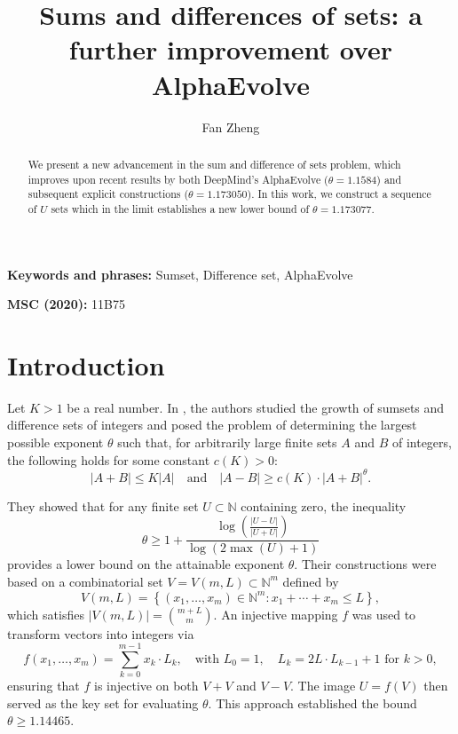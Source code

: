 \documentclass[12 pt]{article}
\title{Sums and differences of sets: a further improvement over AlphaEvolve}
\author{Fan Zheng}
\begin{document}
\maketitle

\begin{abstract}
We present a new advancement in the sum and difference of sets problem, which improves upon recent results by both DeepMind's AlphaEvolve ($\theta = 1.1584$) and subsequent explicit constructions ($\theta = 1.173050$). In this work, we construct a sequence of $U$ sets which in the limit establishes a new lower bound of $\theta = 1.173077$.
\end{abstract}

\noindent\textbf{Keywords and phrases:} Sumset, Difference set, AlphaEvolve

\medskip

\noindent\textbf{MSC (2020):} 11B75

\section{Introduction}

Let \( K > 1 \) be a real number. In \cite{gyarmati2007}, the authors studied the growth of sumsets and difference sets of integers and posed the problem of determining the largest possible exponent \( \theta \) such that, for arbitrarily large finite sets \( A \) and \( B \) of integers, the following holds for some constant \( c(K) > 0 \):
\begin{equation}
    |A + B| \leq K|A| \quad \text{and} \quad |A - B| \geq c(K) \cdot |A + B|^\theta.
    \label{eq:theta}
\end{equation}

They showed that for any finite set \( U \subset \mathbb{N} \) containing zero, the inequality
\[
\theta \geq 1 + \frac{\log\left(\frac{|U - U|}{|U + U|}\right)}{\log(2\max(U) + 1)}
\]
provides a lower bound on the attainable exponent \( \theta \). Their constructions were based on a combinatorial set \( V = V(m, L) \subset \mathbb{N}^m \) defined by
\[
V(m, L) = \left\{ (x_1, \ldots, x_m) \in \mathbb{N}^m : x_1 + \cdots + x_m \leq L \right\},
\]
which satisfies \( |V(m, L)| = \binom{m + L}{m} \). An injective mapping \( f \) was used to transform vectors into integers via
\[
f(x_1, \ldots, x_m) = \sum_{k=0}^{m-1} x_k \cdot L_k, \quad \text{with } L_0 = 1, \quad L_k = 2L \cdot L_{k-1} + 1 \text{ for } k > 0,
\]
ensuring that \( f \) is injective on both \( V + V \) and \( V - V \). The image \( U = f(V) \) then served as the key set for evaluating \( \theta \). This approach established the bound \( \theta \geq 1.14465 \).
\end{document}
